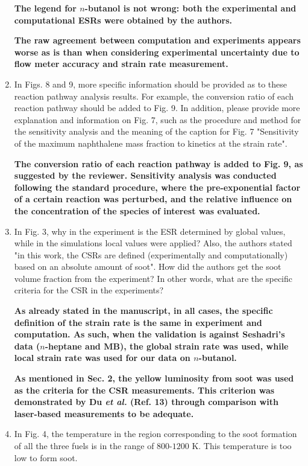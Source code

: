 \documentclass[10pt,letterpaper]{article}
\begin{document}
\begin{enumerate}
\textbf{The legend for $n$-butanol is not wrong: both the experimental and computational ESRs were obtained by the authors. }

\textbf{The raw agreement between computation and experiments appears worse as is than when considering experimental uncertainty due to flow meter accuracy and strain rate measurement.}

\item In Figs. 8 and 9, more specific information should be provided as to these reaction pathway analysis results. For example, the conversion ratio of each reaction pathway should be added to Fig. 9. In addition, please provide more explanation and information on Fig. 7, such as the procedure and method for the sensitivity analysis and the meaning of the caption for Fig. 7 "Sensitivity of the maximum naphthalene mass fraction to kinetics at the strain rate".

\textbf{The conversion ratio of each reaction pathway is added to Fig. 9, as suggested by the reviewer.  Sensitivity analysis was conducted following the standard procedure, where the pre-exponential factor of a certain reaction was perturbed, and the relative influence on the concentration of the species of interest was evaluated.}

\item In Fig. 3, why in the experiment is the ESR determined by global values, while in the simulations local values were applied? Also, the authors stated "in this work, the CSRs are defined (experimentally and computationally) based on an absolute amount of soot". How did the authors get the soot volume fraction from the experiment? In other words, what are the specific criteria for the CSR in the experiments?

\textbf{As already stated in the manuscript, in all cases, the specific definition of the strain rate is the same in experiment and computation.  As such, when the validation is against Seshadri's data ($n$-heptane and MB), the global strain rate was used, while local strain rate was used for our data on $n$-butanol.}

\textbf{As mentioned in Sec. 2, the yellow luminosity from soot was used as the criteria for the CSR measurements. This criterion was demonstrated by Du \emph{et al.} (Ref. 13) through comparison with laser-based measurements to be adequate.}

\item In Fig. 4, the temperature in the region corresponding to the soot formation of all the three fuels is in the range of $800$-$1200$ K. This temperature is too low to form soot.


\end{enumerate}
\end{document}
